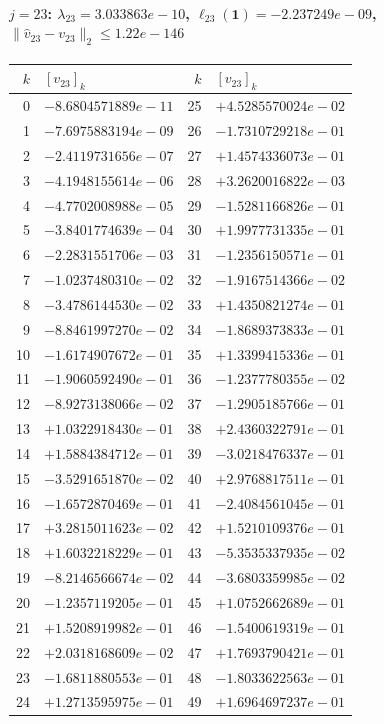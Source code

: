 \documentclass[11pt]{article}
\begin{document}
\paragraph{$j = 23$: $\lambda_{23} = 3.033863e-10$, \quad $\ell_{23}(\mathbf{1}) = -2.237249e-09$, \quad $\|\hat{v}_{23} - v_{23}\|_2 \leq 1.22e-146$}
\begin{center}
{\footnotesize
\begin{tabular}{r@{\;\;}l@{\quad}r@{\;\;}l}
\toprule
$k$ & $[v_{23}]_k$ & $k$ & $[v_{23}]_k$ \\
\midrule
0 & $-8.6804571889e-11$ & 25 & $+4.5285570024e-02$ \\
1 & $-7.6975883194e-09$ & 26 & $-1.7310729218e-01$ \\
2 & $-2.4119731656e-07$ & 27 & $+1.4574336073e-01$ \\
3 & $-4.1948155614e-06$ & 28 & $+3.2620016822e-03$ \\
4 & $-4.7702008988e-05$ & 29 & $-1.5281166826e-01$ \\
5 & $-3.8401774639e-04$ & 30 & $+1.9977731335e-01$ \\
6 & $-2.2831551706e-03$ & 31 & $-1.2356150571e-01$ \\
7 & $-1.0237480310e-02$ & 32 & $-1.9167514366e-02$ \\
8 & $-3.4786144530e-02$ & 33 & $+1.4350821274e-01$ \\
9 & $-8.8461997270e-02$ & 34 & $-1.8689373833e-01$ \\
10 & $-1.6174907672e-01$ & 35 & $+1.3399415336e-01$ \\
11 & $-1.9060592490e-01$ & 36 & $-1.2377780355e-02$ \\
12 & $-8.9273138066e-02$ & 37 & $-1.2905185766e-01$ \\
13 & $+1.0322918430e-01$ & 38 & $+2.4360322791e-01$ \\
14 & $+1.5884384712e-01$ & 39 & $-3.0218476337e-01$ \\
15 & $-3.5291651870e-02$ & 40 & $+2.9768817511e-01$ \\
16 & $-1.6572870469e-01$ & 41 & $-2.4084561045e-01$ \\
17 & $+3.2815011623e-02$ & 42 & $+1.5210109376e-01$ \\
18 & $+1.6032218229e-01$ & 43 & $-5.3535337935e-02$ \\
19 & $-8.2146566674e-02$ & 44 & $-3.6803359985e-02$ \\
20 & $-1.2357119205e-01$ & 45 & $+1.0752662689e-01$ \\
21 & $+1.5208919982e-01$ & 46 & $-1.5400619319e-01$ \\
22 & $+2.0318168609e-02$ & 47 & $+1.7693790421e-01$ \\
23 & $-1.6811880553e-01$ & 48 & $-1.8033622563e-01$ \\
24 & $+1.2713595975e-01$ & 49 & $+1.6964697237e-01$ \\
\bottomrule
\end{tabular}
}
\end{center}
\end{document}
